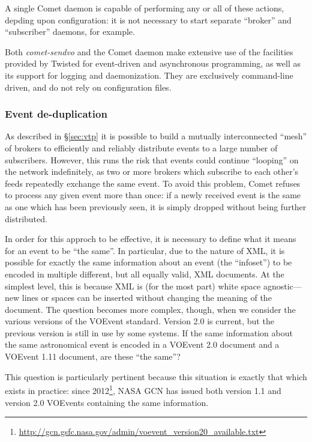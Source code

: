 \documentclass[5p,authoryear]{elsarticle}
\begin{document}
A single Comet daemon is capable of performing any or all of these actions,
depding upon configuration: it is not necessary to start separate ``broker''
and ``subscriber'' daemons, for example.

Both \textit{comet-sendvo} and the Comet daemon make extensive use of the
facilities provided by Twisted for event-driven and asynchronous programming,
as well as its support for logging and daemonization. They are exclusively
command-line driven, and do not rely on configuration files.

\subsubsection{Event de-duplication}

As described in \S\ref{sec:vtp} it is possible to build a mutually
interconnected ``mesh'' of brokers to efficiently and reliably distribute
events to a large number of subscribers. However, this runs the risk that
events could continue ``looping'' on the network indefinitely, as two or more
brokers which subscribe to each other's feeds repeatedly exchange the same
event. To avoid this problem, Comet refuses to process any given event more
than once: if a newly received event is the same as one which has been
previously seen, it is simply dropped without being further distributed.

In order for this approch to be effective, it is necessary to define what it
means for an event to be ``the same''. In particular, due to the nature of
XML, it is possible for exactly the same information about an event (the
``infoset'') to be encoded in multiple different, but all equally valid, XML
documents. At the simplest level, this is because XML is (for the most part)
white space agnostic---new lines or spaces can be inserted without changing
the meaning of the document. The question becomes more complex, though, when
we consider the various versions of the VOEvent standard. Version 2.0
\citep{Seaman:2011} is current, but the previous version
\citep[1.1;]{Seaman:2006} is still in use by some systems. If the same
information about the same astronomical event is encoded in a VOEvent 2.0
document and a VOEvent 1.11 document, are these ``the same''?

This question is particularly pertinent because this situation is exactly that
which exists in practice: since
2012\footnote{\url{http://gcn.gsfc.nasa.gov/admin/voevent_version20_available.txt}},
NASA GCN has issued both version 1.1 and version 2.0 VOEvents containing the
same information.
\end{document}

